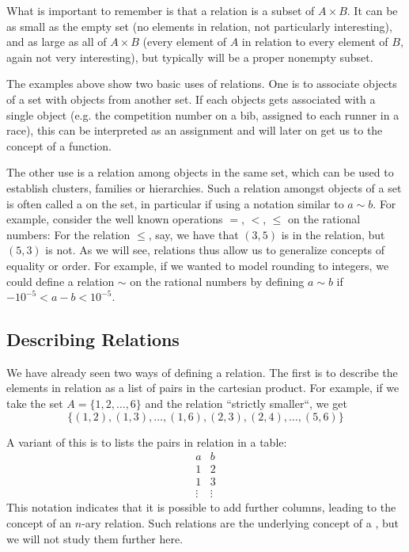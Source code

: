 What is important to remember is that a relation is a subset of $A\times B$.
It can be as small as the empty set (no elements in relation, not
particularly interesting), and as large as all of $A\times B$ (every element
of $A$ in relation to every element of $B$, again not very interesting),
but typically will be a proper nonempty subset.
\medskip

The examples above show two basic uses of relations. One is to associate objects
of a set with objects from another set. If each objects gets associated with
a single object (e.g. the competition number on a bib, assigned to each runner
in a race), this can be interpreted as an assignment and will later on get
us to the concept of a function.

The other use is a relation among objects in the same set, which can be used
to establish clusters, families or hierarchies. Such a relation amongst
objects of a set is often called a  on the set, in
particular if using a notation similar to $a\sim b$.  For example, consider
the well known operations $=$, $<$, $\le$ on the rational numbers: For the
relation $\le$, say, we have that $(3,5)$ is in the relation, but $(5,3)$ is
not. As we will see, relations thus allow us to generalize concepts of
equality or order. For example, if we wanted to model rounding to integers,
we could define a relation $\sim$ on the rational numbers by
defining $a\sim b$ if $-10^{-5}<a-b<10^{-5}$.

\subsection{Describing Relations}
\label{descrel}

We have already seen two ways of defining a relation. The first is to
describe the elements in relation as a list of pairs in the cartesian
product. For example, if we take the set $A=\{1,2,\ldots,6\}$ and the
relation ``strictly smaller``, we get
\[
\{(1,2),(1,3),\ldots,(1,6),(2,3),(2,4),\ldots,(5,6) \}
\]

A variant of this is to lists the pairs in relation in a table:
\[
\begin{array}{c|c}
a&b\\
\hline
1&2\\
1&3\\
\vdots&\vdots
\end{array} 
\]
This notation indicates that it is possible to add further columns, leading
to the concept of an $n$-ary relation. Such relations are the underlying
concept of a , but we will not study them
further here.
\smallskip

